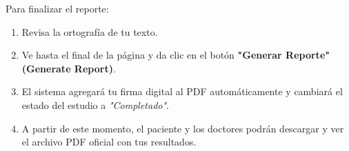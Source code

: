Para finalizar el reporte:
\begin{enumerate}
    \item Revisa la ortografía de tu texto.
    \item Ve hasta el final de la página y da clic en el botón \textbf{"Generar Reporte" (Generate Report)}.
    \item El sistema agregará tu firma digital al PDF automáticamente y cambiará el estado del estudio a \textsl{"Completado"}.
    \item A partir de este momento, el paciente y los doctores podrán descargar y ver el archivo PDF oficial con tus resultados.
\end{enumerate}
